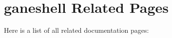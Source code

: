 \section{ganeshell Related Pages}
Here is a list of all related documentation pages:\begin{CompactList}
\item {}

\end{CompactList}
